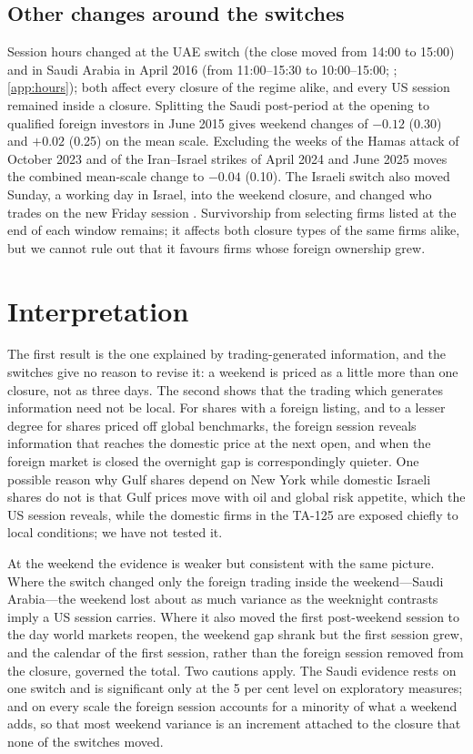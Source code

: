 \subsection{Other changes around the switches}
Session hours changed at the UAE switch (the close moved from 14:00 to 15:00) and in Saudi Arabia in April 2016 (from 11:00--15:30 to 10:00--15:00; \citealp{Mubasher2016}; \ref{app:hours}); both affect every closure of the regime alike, and every US session remained inside a closure. Splitting the Saudi post-period at the opening to qualified foreign investors in June 2015 gives weekend changes of $-0.12$ (0.30) and $+0.02$ (0.25) on the mean scale. Excluding the weeks of the Hamas attack of October 2023 and of the Iran--Israel strikes of April 2024 and June 2025 moves the combined mean-scale change to $-0.04$ (0.10). The Israeli switch also moved Sunday, a working day in Israel, into the weekend closure, and changed who trades on the new Friday session \citep{ISA2026}. Survivorship from selecting firms listed at the end of each window remains; it affects both closure types of the same firms alike, but we cannot rule out that it favours firms whose foreign ownership grew.

\section{Interpretation}\label{sec:interp}

The first result is the one \citet{FrenchRoll1986} explained by trading-generated information, and the switches give no reason to revise it: a weekend is priced as a little more than one closure, not as three days. The second shows that the trading which generates information need not be local. For shares with a foreign listing, and to a lesser degree for shares priced off global benchmarks, the foreign session reveals information that reaches the domestic price at the next open, and when the foreign market is closed the overnight gap is correspondingly quieter. One possible reason why Gulf shares depend on New York while domestic Israeli shares do not is that Gulf prices move with oil and global risk appetite, which the US session reveals, while the domestic firms in the TA-125 are exposed chiefly to local conditions; we have not tested it.

At the weekend the evidence is weaker but consistent with the same picture. Where the switch changed only the foreign trading inside the weekend---Saudi Arabia---the weekend lost about as much variance as the weeknight contrasts imply a US session carries. Where it also moved the first post-weekend session to the day world markets reopen, the weekend gap shrank but the first session grew, and the calendar of the first session, rather than the foreign session removed from the closure, governed the total. Two cautions apply. The Saudi evidence rests on one switch and is significant only at the 5 per cent level on exploratory measures; and on every scale the foreign session accounts for a minority of what a weekend adds, so that most weekend variance is an increment attached to the closure that none of the switches moved.

